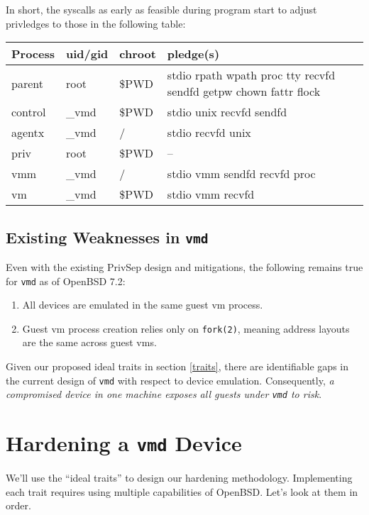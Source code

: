 \documentclass[conference]{IEEEtran}
\begin{document}
In short, the syscalls as early as feasible during program start to
adjust privledges to those in the following table:

\begin{center}
\begin{tabular}{| l | l | l | p{3cm} |}
  \hline
  Process & uid/gid & chroot & pledge(s) \\ \hline
  parent & root & \$PWD & stdio rpath wpath proc tty recvfd sendfd getpw chown fattr flock \\ \hline
  control & \_vmd & \$PWD & stdio unix recvfd sendfd \\ \hline
  agentx & \_vmd & / & stdio recvfd unix \\ \hline
  priv & root & \$PWD & -- \\ \hline
  vmm & \_vmd & / & stdio vmm sendfd recvfd proc \\ \hline
  vm & \_vmd & \$PWD & stdio vmm recvfd \\
  \hline
\end{tabular}
\end{center}

\vspace{3mm}
\subsection{Existing Weaknesses in \texttt{vmd}}
Even with the existing PrivSep design and mitigations, the following
remains true for \texttt{vmd} as of OpenBSD 7.2:

\vspace{2mm}
\begin{enumerate}
\item All devices are emulated in the same guest vm process.
\item Guest vm process creation relies only on \texttt{fork(2)},
  meaning address layouts are the same across guest vms.
\end{enumerate}
\vspace{2mm}

Given our proposed ideal traits in section \ref{traits}, there are
identifiable gaps in the current design of \texttt{vmd} with respect
to device emulation. Consequently, \emph{a compromised device in one
machine exposes all guests under \texttt{vmd} to risk}.


\vspace{5mm}
\section{Hardening a \texttt{vmd} Device}
We'll use the ``ideal traits'' to design our hardening
methodology. Implementing each trait requires using multiple
capabilities of OpenBSD. Let's look at them in order.
\end{document}
